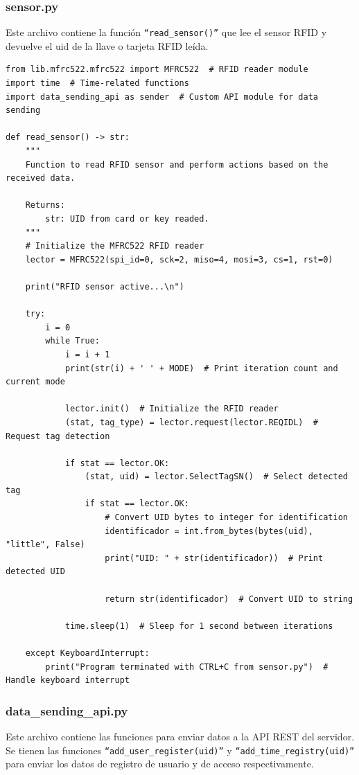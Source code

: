 \documentclass{article}
\begin{document}
\subsubsection{sensor.py}
Este archivo contiene la función \texttt{``read\_sensor()''} que lee el sensor RFID y devuelve el uid de la llave o tarjeta RFID leída.
\begin{lstlisting}
from lib.mfrc522.mfrc522 import MFRC522  # RFID reader module
import time  # Time-related functions
import data_sending_api as sender  # Custom API module for data sending

def read_sensor() -> str:
    """
    Function to read RFID sensor and perform actions based on the received data.

    Returns:
        str: UID from card or key readed.
    """
    # Initialize the MFRC522 RFID reader
    lector = MFRC522(spi_id=0, sck=2, miso=4, mosi=3, cs=1, rst=0)

    print("RFID sensor active...\n")

    try:
        i = 0
        while True:
            i = i + 1
            print(str(i) + ' ' + MODE)  # Print iteration count and current mode

            lector.init()  # Initialize the RFID reader
            (stat, tag_type) = lector.request(lector.REQIDL)  # Request tag detection

            if stat == lector.OK:
                (stat, uid) = lector.SelectTagSN()  # Select detected tag
                if stat == lector.OK:
                    # Convert UID bytes to integer for identification
                    identificador = int.from_bytes(bytes(uid), "little", False)
                    print("UID: " + str(identificador))  # Print detected UID

                    return str(identificador)  # Convert UID to string
                
            time.sleep(1)  # Sleep for 1 second between iterations

    except KeyboardInterrupt:
        print("Program terminated with CTRL+C from sensor.py")  # Handle keyboard interrupt
\end{lstlisting}

\subsubsection{data\_sending\_api.py}
Este archivo contiene las funciones para enviar datos a la API REST del servidor.
Se tienen las funciones \texttt{``add\_user\_register(uid)''} y \texttt{``add\_time\_registry(uid)''} para enviar los datos de registro de usuario y de acceso respectivamente.
\end{document}
